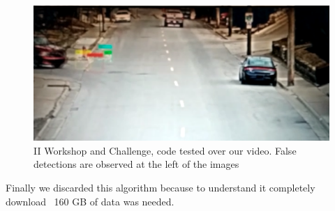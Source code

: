 \documentclass[journal, a4paper]{IEEEtran}
\begin{document}
\begin{figure}[ht] \centering
\includegraphics[scale=0.2]{images/bad_results.png}   
\caption{\label{fig:dadRes} II Workshop and Challenge, code tested over our video.  False detections are observed at the left of the images}
\end{figure}

Finally we discarded this algorithm because to understand it completely download ~160 GB of data was needed.



\end{document}

